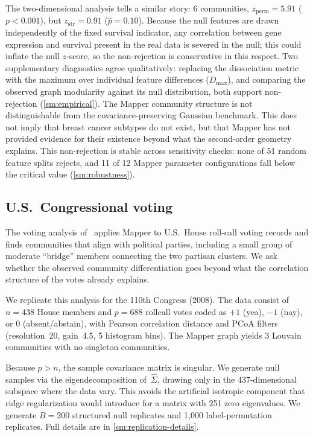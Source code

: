 \documentclass[hidelinks]{siamart251216}
\begin{document}
The two-dimensional analysis tells a similar story: 6 communities,
$z_{\mathrm{perm}} = 5.91$ ($p < 0.001$), but
$z_{\mathrm{str}} = 0.91$ ($\hat{p} = 0.10$).  Because the null
features are drawn independently of the fixed survival indicator, any
correlation between gene expression and survival present in the real
data is severed in the null; this could inflate the null $z$-score, so
the non-rejection is conservative in this respect.  Two supplementary diagnostics agree qualitatively: replacing the
dissociation metric with the maximum over individual feature differences
($D_{\max}$), and comparing the observed graph modularity against its
null distribution, both support non-rejection (\cref{sm:empirical}).  The Mapper community structure is not
distinguishable from the covariance-preserving Gaussian benchmark.  This
does not imply that breast cancer subtypes do not exist, but that Mapper
has not provided evidence for their existence beyond what the
second-order geometry explains.  This non-rejection is stable across
sensitivity checks: none of
51 random feature splits rejects, and 11 of 12 Mapper parameter
configurations fall below the critical value (\cref{sm:robustness}).


\subsection{U.S.\ Congressional voting}\label{sec:res-voting}

The voting analysis of~\cite{Lum2013} applies Mapper to U.S.\ House
roll-call voting records and finds communities that align with political
parties, including a small group of moderate ``bridge'' members
connecting the two partisan clusters.  We ask whether the observed
community differentiation goes beyond what the correlation structure of
the votes already explains.

We replicate this analysis for the 110th Congress (2008).  The data
consist of $n = 438$ House members and $p = 688$ rollcall votes coded as
$+1$ (yea), $-1$ (nay), or $0$ (absent/abstain), with Pearson
correlation distance and PCoA filters (resolution~20, gain~4.5,
5 histogram bins).  The Mapper graph yields 3 Louvain communities with
no singleton communities.

Because $p > n$, the sample covariance matrix is singular.  We generate
null samples via the eigendecomposition of~$\hat{\Sigma}$, drawing only
in the 437-dimensional subspace where the data vary.  This avoids the
artificial isotropic component that ridge regularization would introduce
for a matrix with 251 zero eigenvalues.  We generate $B = 200$ structured
null replicates and 1,000 label-permutation replicates.  Full details
are in \cref{sm:replication-details}.
\end{document}
